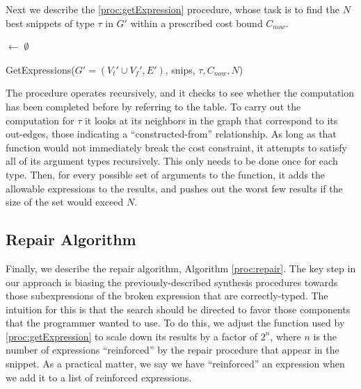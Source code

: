 Next we describe the \ref{proc:getExpression} procedure, whose task is
to find the $N$ best snippets of type $\tau$ in $G'$ within a
prescribed cost bound $C_{now}$.
\begin{procedure}[htb]
\lIf{$\tau$ $\in$ \Keys{\Snips}}{\Return{\Snips$[\tau]$}}
\Results $\leftarrow$ $\emptyset$ \;
\Return{\Results}
\caption{GetExpressions({$G'=(V_t' \cup V_f', E')$}, snips, $\tau, C_{now}, N$)}\label{proc:getExpression}
\end{procedure}
The procedure operates recursively, and it checks to see whether the
computation has been completed before by referring to the \Snips
table. To carry out the computation for $\tau$ it looks at its
neighbors in the graph that correspond to its out-edges, those
indicating a ``constructed-from'' relationship. As long as that
function would not immediately break the cost constraint, it attempts
to satisfy all of its argument types recursively. This only needs to
be done once for each type. Then, for every possible set of arguments
to the function, it adds the allowable expressions to the results, and
pushes out the worst few results if the size of the set would exceed
$N$.

\subsection{Repair Algorithm}
\label{sec:algorithm:repair}
Finally, we describe the repair algorithm, Algorithm \ref{proc:repair}. The key step in our
approach is biasing the previously-described synthesis procedures
towards those subexpressions of the broken expression that are
correctly-typed. The intuition for this is that the search should be
directed to favor those components that the programmer wanted to use.
To do this, we adjust the \Cost function used by \ref{proc:getExpression} to 
scale down its results by a factor of $2^n$, where $n$ is the number of
expressions ``reinforced'' by the repair procedure that appear in the
snippet. As a practical matter, we say we have ``reinforced'' an
expression when we add it to a list of reinforced expressions.

